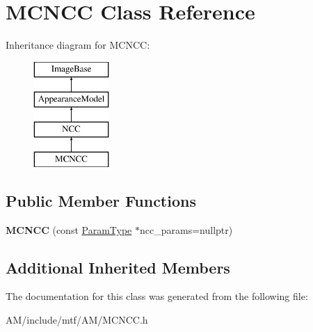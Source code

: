\hypertarget{classMCNCC}{\section{M\-C\-N\-C\-C Class Reference}
\label{classMCNCC}
}
Inheritance diagram for M\-C\-N\-C\-C\-:\begin{figure}[H]
\begin{center}
\leavevmode
\includegraphics[height=4.000000cm]{classMCNCC}
\end{center}
\end{figure}
\subsection*{Public Member Functions}
\begin{DoxyCompactItemize}
\item 
\hypertarget{classMCNCC_afab4798ee5f711e4d83c3b6b50dc980f}{{\bfseries M\-C\-N\-C\-C} (const \hyperlink{structNCCParams}{Param\-Type} $\ast$ncc\-\_\-params=nullptr)}\label{classMCNCC_afab4798ee5f711e4d83c3b6b50dc980f}

\end{DoxyCompactItemize}
\subsection*{Additional Inherited Members}


The documentation for this class was generated from the following file\-:\begin{DoxyCompactItemize}
\item 
A\-M/include/mtf/\-A\-M/M\-C\-N\-C\-C.\-h\end{DoxyCompactItemize}
